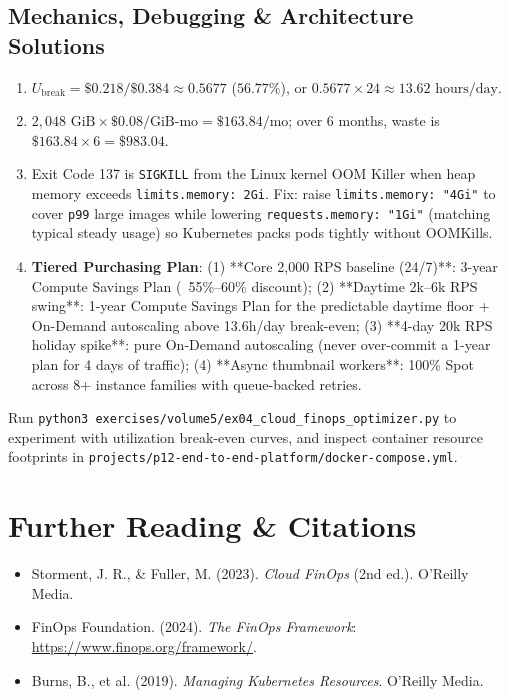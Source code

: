 \subsection*{Mechanics, Debugging \& Architecture Solutions}
\begin{enumerate}[label=\textbf{Solution~\thechapter.\arabic*}, leftmargin=*]
  \item $U_{\text{break}} = \$0.218 / \$0.384 \approx 0.5677$ ($56.77\%$), or $0.5677 \times 24 \approx 13.62\text{ hours/day}$.
  \item $2,048\text{ GiB} \times \$0.08/\text{GiB-mo} = \$163.84/\text{mo}$; over 6 months, waste is $\$163.84 \times 6 = \mathbf{\$983.04}$.
  \item Exit Code 137 is \texttt{SIGKILL} from the Linux kernel OOM Killer when heap memory exceeds \texttt{limits.memory: 2Gi}. Fix: raise \texttt{limits.memory: "4Gi"} to cover \texttt{p99} large images while lowering \texttt{requests.memory: "1Gi"} (matching typical steady usage) so Kubernetes packs pods tightly without OOMKills.
  \item \textbf{Tiered Purchasing Plan}: (1) **Core 2,000 RPS baseline (24/7)**: 3-year Compute Savings Plan (~55\%--60\% discount); (2) **Daytime 2k--6k RPS swing**: 1-year Compute Savings Plan for the predictable daytime floor + On-Demand autoscaling above 13.6h/day break-even; (3) **4-day 20k RPS holiday spike**: pure On-Demand autoscaling (never over-commit a 1-year plan for 4 days of traffic); (4) **Async thumbnail workers**: 100\% Spot across 8+ instance families with queue-backed retries.
\end{enumerate}

\begin{labbridgebox}
Run \texttt{python3 exercises/volume5/ex04\_cloud\_finops\_optimizer.py} to experiment with utilization break-even curves, and inspect container resource footprints in \texttt{projects/p12-end-to-end-platform/docker-compose.yml}.
\end{labbridgebox}

\section{Further Reading \protect\& Citations}
\begin{itemize}[leftmargin=18pt]
  \item Storment, J. R., \& Fuller, M. (2023). \textit{Cloud FinOps} (2nd ed.). O'Reilly Media.
  \item FinOps Foundation. (2024). \textit{The FinOps Framework}: \url{https://www.finops.org/framework/}.
  \item Burns, B., et al. (2019). \textit{Managing Kubernetes Resources}. O'Reilly Media.
\end{itemize}
